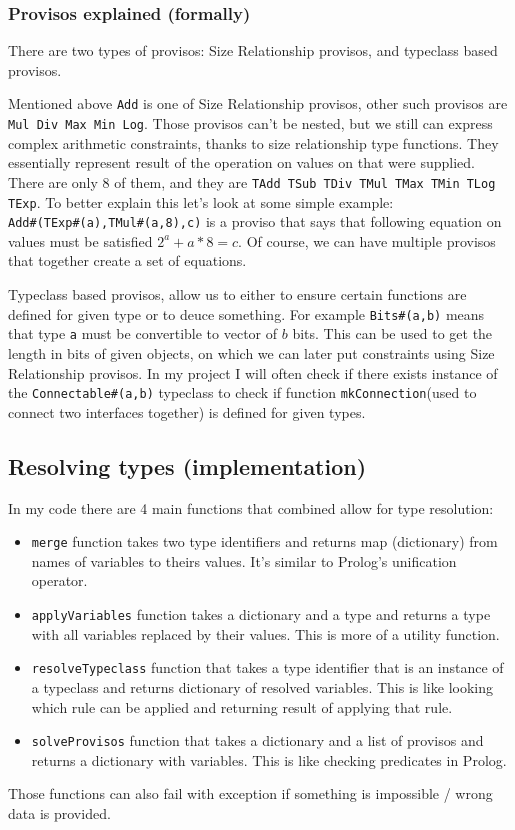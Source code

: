\documentclass[14pt]{report}
\begin{document}
\subsubsection{Provisos explained (formally)}
There are two types of provisos: Size Relationship provisos, and typeclass based provisos.

Mentioned above \verb!Add! is one of Size Relationship provisos, other such provisos are \verb!Mul Div Max Min Log!. Those provisos can't be nested, but we still can express complex arithmetic constraints, thanks to size relationship type functions. They essentially represent result of the operation on values on that were supplied. There are only 8 of them, and they are \verb!TAdd TSub TDiv TMul TMax TMin TLog TExp!.
To better explain this let's look at some simple example: \\
\verb!Add#(TExp#(a),TMul#(a,8),c)! is a proviso that says that following equation on values must be satisfied $2^a+a*8 = c$.
Of course, we can have multiple provisos that together create a set of equations. 

Typeclass based provisos, allow us to either to ensure certain functions are defined for given type or to deuce something. For example \verb!Bits#(a,b)! means that type \verb!a! must be convertible to vector of $b$ bits. This can be used to get the length in bits of given objects, on which we can later put constraints using Size Relationship provisos.
In my project I will often check if there exists instance of the \verb!Connectable#(a,b)! typeclass to check if function \verb!mkConnection!(used to connect two interfaces together) is defined for given types.

\subsection{Resolving types (implementation)}
In my code there are 4 main functions that combined allow for type resolution:
\begin{itemize}
    \item \verb!merge! function takes two type identifiers and returns map (dictionary) from names of variables to theirs values. It's similar to Prolog's unification operator.
    \item \verb!applyVariables! function takes a dictionary and a type and returns a type with all variables replaced by their values. This is more of a utility function.
    \item \verb!resolveTypeclass! function that takes a type identifier that is an instance of a typeclass and returns dictionary of resolved variables. This is like looking which rule can be applied and returning result of applying that rule.
    \item \verb!solveProvisos! function that takes a dictionary and a list of provisos and returns a dictionary with variables. This is like checking predicates in Prolog.
\end{itemize}
Those functions can also fail with exception if something is impossible / wrong data is provided.
\end{document}
